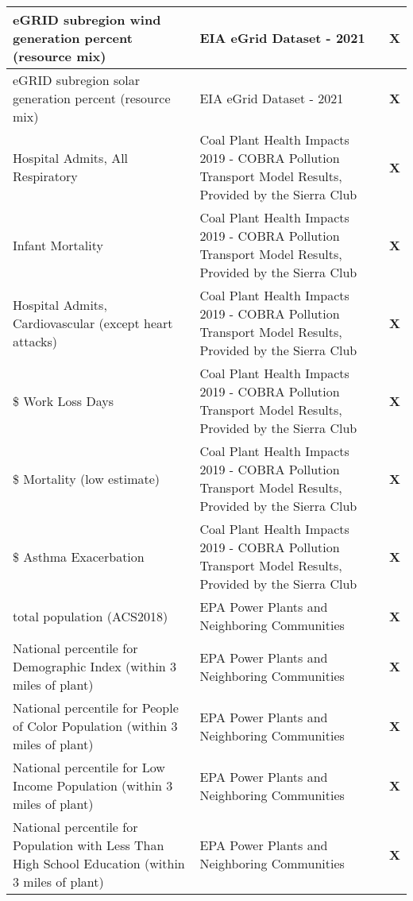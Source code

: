 \begin{table}[htb]
\begin{adjustbox}{width=\textwidth}
\begin{tabular}{|l | l | l |}
        \midrule
        eGRID subregion wind generation percent (resource mix) & EIA eGrid Dataset - 2021 & \textbf{X} \\
        \midrule
        eGRID subregion solar generation percent (resource mix) & EIA eGrid Dataset - 2021 & \textbf{X} \\
        \midrule
        Hospital Admits, All Respiratory & Coal Plant Health Impacts 2019 - COBRA Pollution Transport Model Results, Provided by the Sierra Club & \textbf{X} \\
        \midrule
        Infant Mortality & Coal Plant Health Impacts 2019 - COBRA Pollution Transport Model Results, Provided by the Sierra Club & \textbf{X} \\
        \midrule
        Hospital Admits, Cardiovascular (except heart attacks) & Coal Plant Health Impacts 2019 - COBRA Pollution Transport Model Results, Provided by the Sierra Club & \textbf{X} \\
        \midrule
        \$ Work Loss Days & Coal Plant Health Impacts 2019 - COBRA Pollution Transport Model Results, Provided by the Sierra Club & \textbf{X} \\
        \midrule
        \$ Mortality (low estimate) & Coal Plant Health Impacts 2019 - COBRA Pollution Transport Model Results, Provided by the Sierra Club & \textbf{X} \\
        \midrule
        \$ Asthma Exacerbation & Coal Plant Health Impacts 2019 - COBRA Pollution Transport Model Results, Provided by the Sierra Club & \textbf{X} \\
        \midrule
        total population (ACS2018) & EPA Power Plants and Neighboring Communities & \textbf{X} \\
        \midrule
        National percentile for Demographic Index (within 3 miles of plant) & EPA Power Plants and Neighboring Communities & \textbf{X} \\
        \midrule
        National percentile for People of Color Population (within 3 miles of plant) & EPA Power Plants and Neighboring Communities & \textbf{X} \\
        \midrule
        National percentile for Low Income Population (within 3 miles of plant) & EPA Power Plants and Neighboring Communities & \textbf{X} \\
        \midrule
        National percentile for Population with Less Than High School Education (within 3 miles of plant) & EPA Power Plants and Neighboring Communities & \textbf{X} \\
        \midrule

\end{tabular}
\end{adjustbox}
\end{table}
